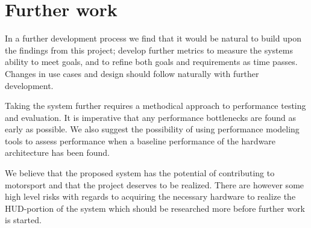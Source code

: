 \section{Further work}

In a further development process we find that it
would be natural to build upon the findings from this project; develop
further metrics to measure the systems ability to meet goals, and to refine
both goals and requirements as time passes. Changes in use cases and design
should follow naturally with further development.

Taking the system further requires a methodical approach to performance testing
and evaluation. It is imperative that any performance bottlenecks are found as
early as possible. We also suggest the possibility of using performance 
modeling tools to assess
performance when a baseline performance of the hardware architecture has been
found. 

We believe that the proposed system has the potential of contributing to
motorsport and that the project deserves to be realized. There are however some
high level risks with regards to acquiring the necessary hardware to realize
the HUD-portion of the system which should be researched more before further
work is started. 
